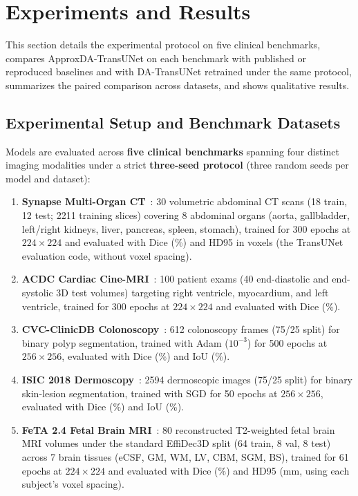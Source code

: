 \section{Experiments and Results}
\label{sec:experiments}

This section details the experimental protocol on five clinical benchmarks, compares ApproxDA-TransUNet on each benchmark with published or reproduced baselines and with DA-TransUNet retrained under the same protocol, summarizes the paired comparison across datasets, and shows qualitative results.

\subsection{Experimental Setup and Benchmark Datasets}
Models are evaluated across \textbf{five clinical benchmarks} spanning four distinct imaging modalities under a strict \textbf{three-seed protocol} (three random seeds per model and dataset):
\begin{enumerate}
    \item \textbf{Synapse Multi-Organ CT}~\cite{landman2015miccai}: 30 volumetric abdominal CT scans (18 train, 12 test; 2211 training slices) covering 8 abdominal organs (aorta, gallbladder, left/right kidneys, liver, pancreas, spleen, stomach), trained for 300 epochs at $224 \times 224$ and evaluated with Dice (\%) and HD95 in voxels (the TransUNet evaluation code, without voxel spacing).
    \item \textbf{ACDC Cardiac Cine-MRI}~\cite{bernard2018deep}: 100 patient exams (40 end-diastolic and end-systolic 3D test volumes) targeting right ventricle, myocardium, and left ventricle, trained for 300 epochs at $224 \times 224$ and evaluated with Dice (\%).
    \item \textbf{CVC-ClinicDB Colonoscopy}~\cite{bernal2015cvc}: 612 colonoscopy frames (75/25 split) for binary polyp segmentation, trained with Adam ($10^{-3}$) for 500 epochs at $256 \times 256$, evaluated with Dice (\%) and IoU (\%).
    \item \textbf{ISIC 2018 Dermoscopy}~\cite{codella2019isic}: 2594 dermoscopic images (75/25 split) for binary skin-lesion segmentation, trained with SGD for 50 epochs at $256 \times 256$, evaluated with Dice (\%) and IoU (\%).
    \item \textbf{FeTA 2.4 Fetal Brain MRI}~\cite{payette2021feta}: 80 reconstructed T2-weighted fetal brain MRI volumes under the standard EffiDec3D split (64 train, 8 val, 8 test) across 7 brain tissues (eCSF, GM, WM, LV, CBM, SGM, BS), trained for 61 epochs at $224 \times 224$ and evaluated with Dice (\%) and HD95 (mm, using each subject's voxel spacing).
\end{enumerate}

